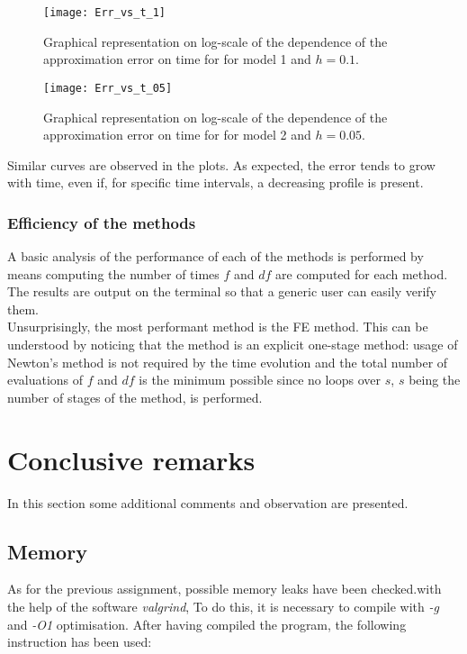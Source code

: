 \documentclass[11pt]{article}
\theoremstyle{theorem}
\theoremstyle{definition}
\begin{document}
\begin{figure}[H]
	\begin{center}
		\texttt{[image: Err\_vs\_t\_1]}
	\end{center}
	\caption{Graphical representation on log-scale of the dependence of the approximation error on time for for model 1 and $h=0.1$.
		\label{fig:Err_vs_t_0_1}}
\end{figure}

\begin{figure}[H]
	\begin{center}
		\texttt{[image: Err\_vs\_t\_05]}
	\end{center}
	\caption{Graphical representation on log-scale of the dependence of the approximation error on time for for model 2 and $h=0.05$.
		\label{fig:Err_vs_t_0_05}}
\end{figure}

Similar curves are observed in the plots. As expected, the error tends to grow with time, even if, for specific time intervals, a decreasing profile is present.\\

\subsubsection{Efficiency of the methods}
A basic analysis of the performance of each of the methods is performed by means computing the number of times $f$ and $df$ are computed for each method. The results are output on the terminal so that a generic user can easily verify them.\\
Unsurprisingly, the most performant method is the FE method. This can be understood by noticing that the method is an explicit one-stage method: usage of Newton's method is not required by the time evolution and the total number of evaluations of $f$ and $df$ is the minimum possible since no loops over $s$, $s$ being the number of stages of the method, is performed.\\

\section{Conclusive remarks}
In this section some additional comments and observation are presented.

\subsection{Memory}
As for the previous assignment, possible memory leaks have been checked.with the help of the software \emph{valgrind}, To do this, it is necessary to compile with \emph{-g} and \emph{-O1} optimisation. After having compiled the program, the following instruction has been used:
\end{document}
